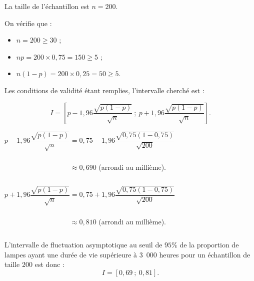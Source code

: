 \begin{corrige}
\begin{enumerate}
          \par
          La taille  de l'échantillon est $n=200$.
          \par
          On vérifie que :
          \par
          \begin{itemize}
               \item $n=200 \geqslant 30$ ;
               \item $np=200 \times 0,75=150 \geqslant 5$ ;
               \item $n(1-p)=200 \times 0,25=50 \geqslant 5$.
          \end{itemize}
          \par
          Les conditions de validité étant remplies, l'intervalle cherché est :
          \par
          \[ I=\left[p-1,96\dfrac{\sqrt{p(1-p)}}{\sqrt{n}}~;~p+1,96\dfrac{\sqrt{p(1-p)}}{\sqrt{n}}\right]. \]
          \par
          \vspace{1cm}
          \par
          $p-1,96\dfrac{\sqrt{p(1-p)}}{\sqrt{n}}=0,75-1,96\dfrac{\sqrt{0,75(1-0,75)}}{\sqrt{200}}$
          \par
          $\phantom{p-1,96\dfrac{\sqrt{p(1-p)}}{\sqrt{n}}} \approx 0,690 $ (arrondi au millième).
          \par
          $p+1,96\dfrac{\sqrt{p(1-p)}}{\sqrt{n}}=0,75+1,96\dfrac{\sqrt{0,75(1-0,75)}}{\sqrt{200}}$
          \par
          $\phantom{p+1,96\dfrac{\sqrt{p(1-p)}}{\sqrt{n}}} \approx 0,810 $ (arrondi au millième).
          \par
          L'intervalle de fluctuation asymptotique au seuil de $95\%$ de la proportion de lampes ayant une durée de vie supérieure à 3\ 000 heures pour un échantillon de taille 200 est donc :
          \[ I=[0,69~;~0,81]. \]
\end{enumerate}
\end{corrige}
